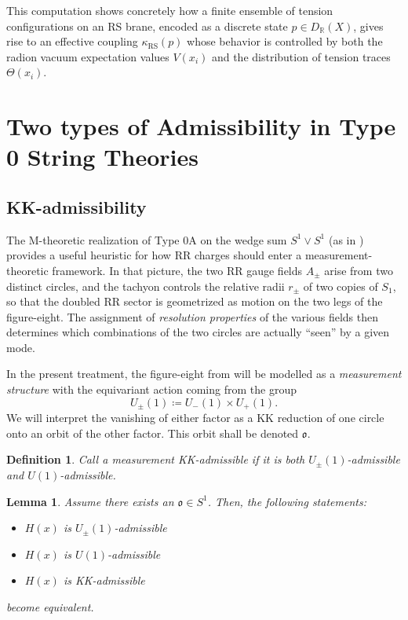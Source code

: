 \documentclass{article}
\newtheorem{dn}{Definition}
\newtheorem{lem}{Lemma}
\numberwithin{tm}{section}
\numberwithin{dn}{section}
\numberwithin{as}{section}
\numberwithin{rk}{section}
\numberwithin{lem}{section}
\numberwithin{ax}{section}
\numberwithin{pp}{section}
\numberwithin{eg}{section}
\numberwithin{war}{section}
\numberwithin{equation}{section}
\numberwithin{prop}{section}
\numberwithin{nt}{section}
\numberwithin{rc}{section}
\numberwithin{setup}{section}
\begin{document}
	This computation shows concretely how a finite ensemble of tension configurations on an RS brane, encoded as a discrete state $p \in D_{\mathbb{R}}(X)$, gives rise to an effective coupling $\kappa_{\mathrm{RS}}(p)$ whose behavior is controlled by both the radion vacuum expectation values $V(x_i)$ and the distribution of tension traces $\Theta(x_i)$.
	
	
	\appendix
	\section{Two types of Admissibility in Type 0 String Theories} \label{two}
	\subsection{KK-admissibility}
	
	The M-theoretic realization of Type 0A on the wedge sum $S^1 \vee S^1$ (as in \cite{Baykara:2603.13468}) provides a useful heuristic for how RR charges should enter a measurement-theoretic framework. In that picture, the two RR gauge fields $A_\pm$ arise from two distinct circles, and the tachyon controls the relative radii $r_\pm$ of two copies of $S_1$, so that the doubled RR sector is geometrized as motion on the two legs of the figure-eight. The assignment of  \emph{resolution properties} of the various fields then determines which combinations of the two circles are actually “seen” by a given mode.
	
	In the present treatment, the figure-eight from \cite{Baykara:2603.13468} will be modelled as a \emph{measurement structure} with the equivariant action coming from the group
	$$U_\pm (1) \coloneq U_- (1) \times U_+(1).$$
	We will interpret the vanishing of either factor as a KK reduction of one circle onto an orbit of the other factor. This orbit shall be denoted $\mathfrak{o}$.
	
	\begin{dn} \label{kkadm}
		Call a measurement \emph{KK-admissible} if it is both $U_{\pm}(1)$-admissible and $U(1)$-admissible.
	\end{dn}
	
	\begin{lem}
		Assume there exists an $\mathfrak{o} \in S^1$. Then, the following statements:
		\begin{itemize}
			\item $H(x)$ is $U_\pm(1)$-admissible
			\item $H(x)$ is $U(1)$-admissible
			\item $H(x)$ is KK-admissible
		\end{itemize}
		become equivalent.
	\end{lem}
	
\end{document}
